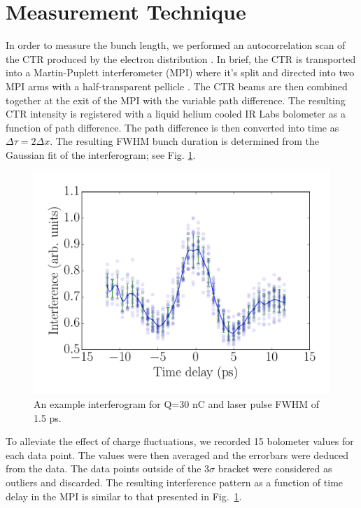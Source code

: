 \documentclass[letterpaper,  %
              ]{jacow-2_3}   %
\begin{document}
\section{Measurement Technique}
In order to measure the bunch length, we performed an autocorrelation scan
of the CTR produced by the electron distribution \cite{Happek, WBarry}.
In brief, the CTR is transported into a Martin-Puplett interferometer (MPI)
where it's split and directed into two MPI arms with a half-transparent pellicle \cite{PhysRevSTAB.9.082801}. 
The CTR beams are then combined together at the exit of the MPI with the variable path difference.
The resulting CTR intensity is registered with a liquid helium cooled IR Labs
bolometer \cite{IRlabs} as a function of path difference.
The path difference is then converted into time as $\Delta \tau = 2 \Delta x$.
The resulting FWHM bunch duration is determined from the Gaussian fit of 
the interferogram; see Fig. \ref{interferogram}.
\begin{figure}
 \includegraphics[width=1.0\linewidth]{images/THPMF048f1}
 \caption{An example interferogram for Q=30 nC and laser pulse FWHM of 1.5 ps.}
 \label{interferogram}
\end{figure}
To alleviate the effect of charge fluctuations, we recorded 15 bolometer values for each data point.
The values were then averaged and the errorbars were deduced from the data. The data points
outside of the 3$\sigma$ bracket were considered as outliers and discarded. The resulting
interference pattern as a function of time delay in the MPI is similar to that presented in Fig.~\ref{interferogram}.
\end{document}
